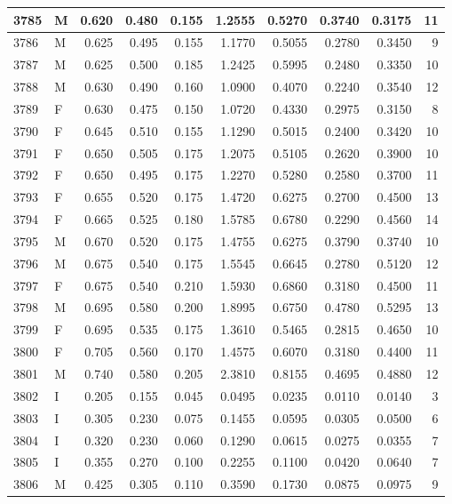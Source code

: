 \documentclass[9pt,twocolumn,twoside,]{pnas-new}
\begin{document}
\begin{tabular}{l|l|r|r|r|r|r|r|r|r}
\hline
3785 & M & 0.620 & 0.480 & 0.155 & 1.2555 & 0.5270 & 0.3740 & 0.3175 & 11\\
\hline
3786 & M & 0.625 & 0.495 & 0.155 & 1.1770 & 0.5055 & 0.2780 & 0.3450 & 9\\
\hline
3787 & M & 0.625 & 0.500 & 0.185 & 1.2425 & 0.5995 & 0.2480 & 0.3350 & 10\\
\hline
3788 & M & 0.630 & 0.490 & 0.160 & 1.0900 & 0.4070 & 0.2240 & 0.3540 & 12\\
\hline
3789 & F & 0.630 & 0.475 & 0.150 & 1.0720 & 0.4330 & 0.2975 & 0.3150 & 8\\
\hline
3790 & F & 0.645 & 0.510 & 0.155 & 1.1290 & 0.5015 & 0.2400 & 0.3420 & 10\\
\hline
3791 & F & 0.650 & 0.505 & 0.175 & 1.2075 & 0.5105 & 0.2620 & 0.3900 & 10\\
\hline
3792 & F & 0.650 & 0.495 & 0.175 & 1.2270 & 0.5280 & 0.2580 & 0.3700 & 11\\
\hline
3793 & F & 0.655 & 0.520 & 0.175 & 1.4720 & 0.6275 & 0.2700 & 0.4500 & 13\\
\hline
3794 & F & 0.665 & 0.525 & 0.180 & 1.5785 & 0.6780 & 0.2290 & 0.4560 & 14\\
\hline
3795 & M & 0.670 & 0.520 & 0.175 & 1.4755 & 0.6275 & 0.3790 & 0.3740 & 10\\
\hline
3796 & M & 0.675 & 0.540 & 0.175 & 1.5545 & 0.6645 & 0.2780 & 0.5120 & 12\\
\hline
3797 & F & 0.675 & 0.540 & 0.210 & 1.5930 & 0.6860 & 0.3180 & 0.4500 & 11\\
\hline
3798 & M & 0.695 & 0.580 & 0.200 & 1.8995 & 0.6750 & 0.4780 & 0.5295 & 13\\
\hline
3799 & F & 0.695 & 0.535 & 0.175 & 1.3610 & 0.5465 & 0.2815 & 0.4650 & 10\\
\hline
3800 & F & 0.705 & 0.560 & 0.170 & 1.4575 & 0.6070 & 0.3180 & 0.4400 & 11\\
\hline
3801 & M & 0.740 & 0.580 & 0.205 & 2.3810 & 0.8155 & 0.4695 & 0.4880 & 12\\
\hline
3802 & I & 0.205 & 0.155 & 0.045 & 0.0495 & 0.0235 & 0.0110 & 0.0140 & 3\\
\hline
3803 & I & 0.305 & 0.230 & 0.075 & 0.1455 & 0.0595 & 0.0305 & 0.0500 & 6\\
\hline
3804 & I & 0.320 & 0.230 & 0.060 & 0.1290 & 0.0615 & 0.0275 & 0.0355 & 7\\
\hline
3805 & I & 0.355 & 0.270 & 0.100 & 0.2255 & 0.1100 & 0.0420 & 0.0640 & 7\\
\hline
3806 & M & 0.425 & 0.305 & 0.110 & 0.3590 & 0.1730 & 0.0875 & 0.0975 & 9\\

\end{tabular}
\end{document}
